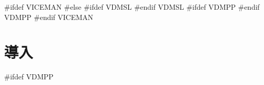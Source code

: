 \documentclass[\pformat,12pt]{jarticle}
\begin{document}


#ifdef VICEMAN
#else
#ifdef VDMSL
#endif VDMSL
#ifdef VDMPP
#endif VDMPP
#endif VICEMAN


\newcommand{\Lit}[1]{`{\tt #1}\Quote}
\newcommand{\Rule}[2]{
  \begin{quote}\begin{tabbing}
    #1\index{#1}\ \ \= = \ \ \= #2  ; %
    
  \end{tabbing}\end{quote}
  }
\newcommand{\SeqPt}[1]{\{\ #1\ \}}
\newcommand{\lfeed}{\\ \> \>}
\newcommand{\dsepl}{\ $|$\ }
\newcommand{\dsep}{\\ \> $|$ \>}
\newcommand{\Lop}[1]{`{\sf #1}\Quote}
\newcommand{\blankline}{\vspace{\baselineskip}}
\newcommand{\Brack}[1]{(\ #1\ )}
\newcommand{\nmk}{\footnotemark}
\newcommand{\ntext}[1]{\footnotetext{{\bf Note: } #1}}
\newlength{\kwlen}
\newcommand{\Keyw}[1]{\settowidth{\kwlen}{\tt #1}\makebox[\kwlen][l]{\sf
    #1}}
\newcommand{\keyw}[1]{{\sf #1}}
\newcommand{\id}[1]{{\tt #1}}
\newcommand{\metaiv}[1]{\begin{alltt}\end{alltt}}

\newcommand{\OptPt}[1]{[\ #1\ ]}
\newcommand{\MAP}[2]{\kw{map }#1\kw{ to }#2}
\newcommand{\INMAP}[2]{\kw{inmap }#1\kw{ to }#2}
\newcommand{\SEQ}[1]{\kw{seq of }#1}
\newcommand{\NSEQ}[1]{\kw{seq1 of }#1}
\newcommand{\SET}[1]{\kw{set of }#1}
\newcommand{\PROD}[2]{#1 * #2}
\newcommand{\TO}[2]{$#1 \To #2$}
\newcommand{\FUN}[2]{#1 \To #2}
\newcommand{\PUBLIC}{\ifthenelse{\boolean{VDMpp}}{public\mbox{}}{\mbox{}}}
\newcommand{\PRIVATE}{\ifthenelse{\boolean{VDMpp}}{private}{\mbox{}}}
\newcommand{\PROTECTED}{\ifthenelse{\boolean{VDMpp}}{protected}{\mbox{}}}




\section{導入}

#ifdef VDMPP
\end{document}
